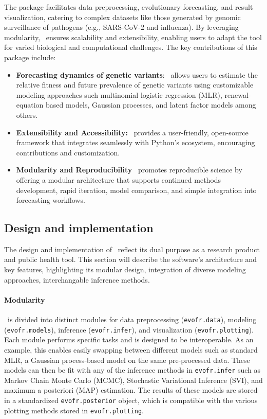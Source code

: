 The package facilitates data preprocessing, evolutionary forecasting, and result visualization, catering to complex datasets like those generated by genomic surveillance of pathogens (e.g., SARS-CoV-2 and influenza). 
By leveraging modularity, \evofr\ ensures scalability and extensibility, enabling users to adapt the tool for varied biological and computational challenges. 
The key contributions of this package include:
\begin{itemize}
	\item \textbf{Forecasting dynamics of genetic variants}: \evofr\ allows users to estimate the relative fitness and future prevalence of genetic variants using customizable modeling approaches such multinomial logistic regression (MLR), renewal-equation based models, Gaussian processes, and latent factor models among others.
	\item \textbf{Extensibility and Accessibility:} \evofr\ provides a user-friendly, open-source framework that integrates seamlessly with Python’s ecosystem, encouraging contributions and customization.
	\item \textbf{Modularity and Reproducibility} \evofr\ promotes reproducible science by offering a modular architecture that supports continued methods development, rapid iteration, model comparison, and simple integration into forecasting workflows.
\end{itemize}

\subsection{Design and implementation}

The design and implementation of \evofr\ reflect its dual purpose as a research product and public health tool.
This section will describe the software's architecture and key features, highlighting its modular design, integration of diverse modeling approaches, interchangable inference methods.

\paragraph{Modularity}

\evofr\ is divided into distinct modules for data preprocessing (\texttt{evofr.data}), modeling (\texttt{evofr.models}), inference (\texttt{evofr.infer}), and visualization (\texttt{evofr.plotting}).
Each module performs specific tasks and is designed to be interoperable.
As an example, this enables easily swapping between different models such as standard MLR, a Gaussian process-based model on the same pre-processed data.
These models can then be fit with any of the inference methods in \texttt{evofr.infer} such as Markov Chain Monte Carlo (MCMC), Stochastic Variational Inference (SVI), and maximum a posteriori (MAP) estimation.
The results of these models are stored in a standardized \texttt{evofr.posterior} object, which is compatible with the various plotting methods stored in \texttt{evofr.plotting}.

